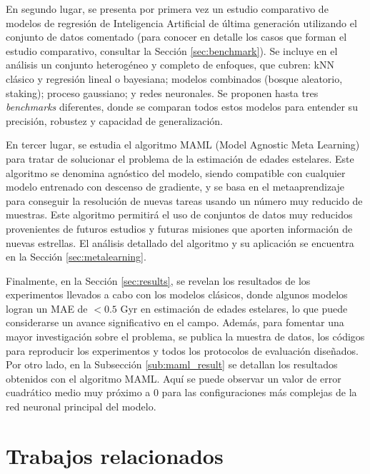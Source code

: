 En segundo lugar, se presenta por primera vez un estudio comparativo de modelos de regresión de Inteligencia Artificial de última generación utilizando el conjunto de datos comentado (para conocer en detalle los casos que forman el estudio comparativo, consultar la Sección \ref{sec:benchmark}). Se incluye en el análisis un conjunto heterogéneo y completo de enfoques, que cubren: kNN clásico y regresión lineal o bayesiana; modelos combinados (bosque aleatorio, staking); proceso gaussiano; y redes neuronales. Se proponen hasta tres \emph{benchmarks} diferentes, donde se comparan todos estos modelos para entender su precisión, robustez y capacidad de generalización.

En tercer lugar, se estudia el algoritmo MAML (Model Agnostic Meta Learning) para tratar de solucionar el problema de la estimación de edades estelares. Este algoritmo se denomina agnóstico del modelo, siendo compatible con cualquier modelo entrenado con descenso de gradiente, y se basa en el metaaprendizaje para conseguir la resolución de nuevas tareas usando un número muy reducido de muestras. Este algoritmo permitirá el uso de conjuntos de datos muy reducidos provenientes de futuros estudios y futuras misiones que aporten información de nuevas estrellas. El análisis detallado del algoritmo y su aplicación se encuentra en la Sección \ref{sec:metalearning}.

Finalmente, en la Sección \ref{sec:results}, se revelan los resultados de los experimentos llevados a cabo con los modelos clásicos, donde algunos modelos logran un MAE de $<0.5$ Gyr en estimación de edades estelares, lo que puede considerarse un avance significativo en el campo. Además, para fomentar una mayor investigación sobre el problema, se publica la muestra de datos, los códigos para reproducir los experimentos y todos los protocolos de evaluación diseñados. Por otro lado, en la Subsección \ref{sub:maml_result} se detallan los resultados obtenidos con el algoritmo MAML. Aquí se puede observar un valor de error cuadrático medio muy próximo a 0 para las configuraciones más complejas de la red neuronal principal del modelo.

 

\chapter{Trabajos relacionados} 
\label{sec:related_work}

